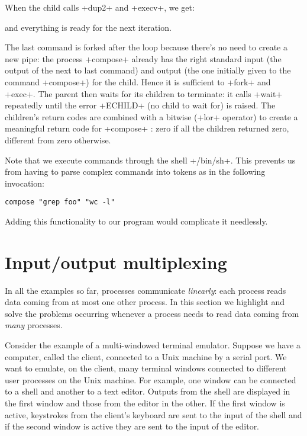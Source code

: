 %
When the child calls \ml+dup2+ and \ml+execv+, we get:
\begin{myimage}[width="100\%"]
\end{myimage}
%
and everything is ready for the next iteration. 

The last command is forked after the loop because there's no need to
create a new pipe: the process \ml+compose+ already has the right
standard input (the output of the next to last command) and output
(the one initially given to the command \ml+compose+) for the
child. Hence it is sufficient to \ml+fork+ and \ml+exec+. The parent then
waits for its children to terminate: it calls \ml+wait+ repeatedly
until the error \ml+ECHILD+ (no child to wait for) is raised. The
children's return codes are combined with a bitwise 
(\ml+lor+ operator) to create a meaningful return code for
\ml+compose+ : zero if all the children returned zero, different from
zero otherwise.

Note that we execute commands through the shell \ml+/bin/sh+. This
prevents us from having to parse complex commands into tokens as
in the following invocation:
%
\begin{lstlisting}
compose "grep foo" "wc -l"
\end{lstlisting}
%
Adding this functionality to our program would complicate it needlessly.

\section{Input/output multiplexing}

In all the examples so far, processes communicate \emph{linearly}:
each process reads data coming from at most one other process. In this
section we highlight and solve the problems occurring whenever a
process needs to read data coming from \emph{many} processes.

Consider the example of a multi-windowed terminal emulator. Suppose we
have a computer, called the client, connected to a Unix machine by a
serial port. We want to emulate, on the client, many terminal windows
connected to different user processes on the Unix machine. For example,
one window can be connected to a shell and another to a text
editor. Outputs from the shell are displayed in the first window and
those from the editor in the other. If the first window is
active, keystrokes from the client's keyboard are sent to the input of
the shell and if the second window is active they are sent to the
input of the editor.

